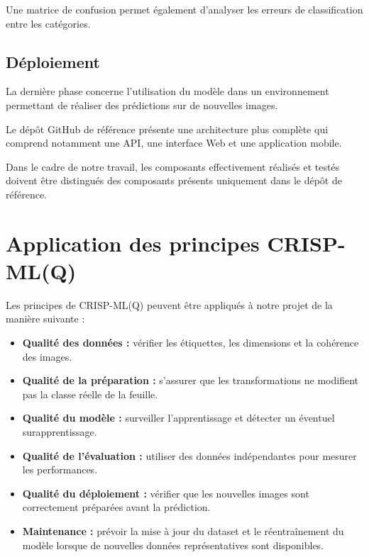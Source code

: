 \documentclass[12pt,a4paper,oneside]{report}
\begin{document}
Une matrice de confusion permet également d'analyser
les erreurs de classification entre les catégories.

\subsection{Déploiement}

La dernière phase concerne l'utilisation du modèle
dans un environnement permettant de réaliser des
prédictions sur de nouvelles images.

Le dépôt GitHub de référence présente une architecture
plus complète qui comprend notamment une API, une
interface Web et une application mobile.

Dans le cadre de notre travail, les composants effectivement
réalisés et testés doivent être distingués des composants
présents uniquement dans le dépôt de référence.

\section{Application des principes CRISP-ML(Q)}

Les principes de CRISP-ML(Q) peuvent être appliqués
à notre projet de la manière suivante :

\begin{itemize}
    \item \textbf{Qualité des données :} vérifier les
    étiquettes, les dimensions et la cohérence des images.

    \item \textbf{Qualité de la préparation :} s'assurer
    que les transformations ne modifient pas la classe
    réelle de la feuille.

    \item \textbf{Qualité du modèle :} surveiller
    l'apprentissage et détecter un éventuel surapprentissage.

    \item \textbf{Qualité de l'évaluation :} utiliser
    des données indépendantes pour mesurer les performances.

    \item \textbf{Qualité du déploiement :} vérifier
    que les nouvelles images sont correctement préparées
    avant la prédiction.

    \item \textbf{Maintenance :} prévoir la mise à jour
    du dataset et le réentraînement du modèle lorsque
    de nouvelles données représentatives sont disponibles.
\end{itemize}
\end{document}
